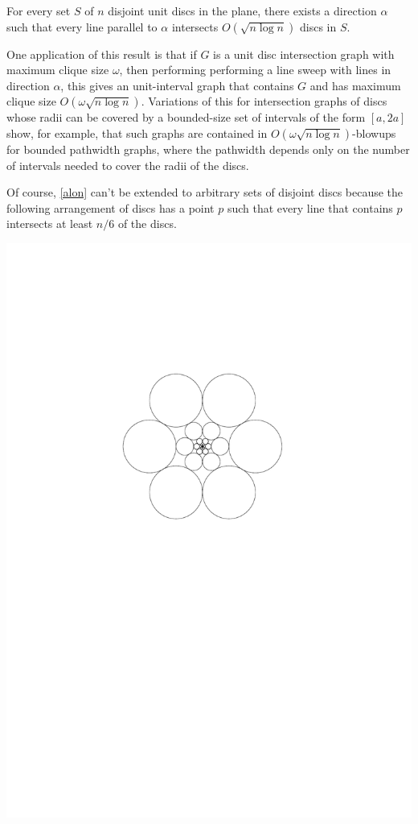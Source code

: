 \documentclass{patmorin}
\begin{document}
\begin{thm}[Alon]\label{alon}
  For every set $S$ of $n$ disjoint unit discs in the plane, there exists a direction $\alpha$ such that every line parallel to $\alpha$ intersects $O(\sqrt{n\log n})$ discs in $S$.
\end{thm}

One application of this result is that if $G$ is a unit disc intersection graph with maximum clique size $\omega$, then performing performing a line sweep with lines in direction $\alpha$, this gives an unit-interval graph that contains $G$ and has maximum clique size $O(\omega \sqrt{n\log n})$.  Variations of this for intersection graphs of discs whose radii can be covered by a bounded-size set of intervals of the form $[a,2a]$ show, for example, that such graphs are contained in $O(\omega\sqrt{n\log n})$-blowups for bounded pathwidth graphs, where the pathwidth depends only on the number of intervals needed to cover the radii of the discs.

Of course, \cref{alon} can't be extended to arbitrary sets of disjoint discs because the following arrangement of discs has a point $p$ such that every line that contains $p$ intersects at least $n/6$ of the discs.

\begin{center}
  \includegraphics{figs/spider}
\end{center}
\end{document}
